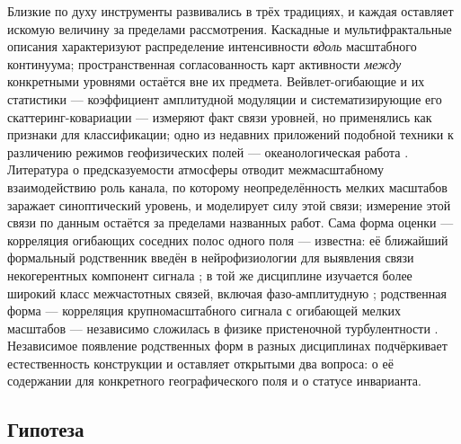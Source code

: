 \documentclass[11pt,a4paper]{article}
\begin{document}
Близкие по духу инструменты развивались в трёх традициях, и каждая оставляет искомую величину за пределами рассмотрения. Каскадные и мультифрактальные описания \cite{LovejoySchertzer2013,Lovejoy2011,Kouhen2024} характеризуют распределение интенсивности \emph{вдоль} масштабного континуума; пространственная согласованность карт активности \emph{между} конкретными уровнями остаётся вне их предмета. Вейвлет-огибающие и их статистики --- коэффициент амплитудной модуляции \cite{Farge1992,Mathis2009} и систематизирующие его скаттеринг-ковариации \cite{Mallat2012,BrunaMallat2013,Cheng2024} --- измеряют факт связи уровней, но применялись как признаки для классификации; одно из недавних приложений подобной техники к различению режимов геофизических полей --- океанологическая работа \cite{Skinner2025}. Литература о предсказуемости атмосферы \cite{Lorenz1969,Zhang2007,RotunnoSnyder2008,Judt2020,SelzCraig2023} отводит межмасштабному взаимодействию роль канала, по которому неопределённость мелких масштабов заражает синоптический уровень, и моделирует силу этой связи; измерение этой связи по данным остаётся за пределами названных работ. Сама форма оценки --- корреляция огибающих соседних полос одного поля --- известна: её ближайший формальный родственник введён в нейрофизиологии для выявления связи некогерентных компонент сигнала \cite{Bruns2000}; в той же дисциплине изучается более широкий класс межчастотных связей, включая фазо-амплитудную \cite{Canolty2006}; родственная форма --- корреляция крупномасштабного сигнала с огибающей мелких масштабов --- независимо сложилась в физике пристеночной турбулентности \cite{Mathis2009}. Независимое появление родственных форм в разных дисциплинах подчёркивает естественность конструкции и оставляет открытыми два вопроса: о её содержании для конкретного географического поля и о статусе инварианта.

\subsection{Гипотеза}
\label{sec:hyp}
\end{document}
